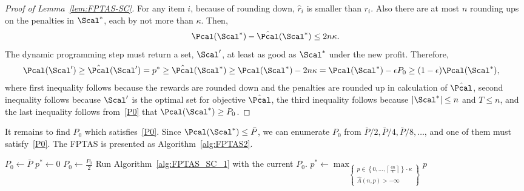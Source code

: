 \begin{proof}[Proof of Lemma~\ref{lem:FPTAS-SC}]
	For any item $i$, because of rounding down, $\hat{r}_i$ is smaller than $r_i$. Also there are at most $n$ rounding ups on the penalties in $\Scal^*$, each by not more than $\kappa$. Then,
	$$
	\Pcal(\Scal^*)-\hat{\Pcal}(\Scal^*)\leq  2n\kappa.
	$$
	The dynamic programming step must return a set, $\Scal'$, at least as good as $\Scal^*$ under the new profit. Therefore,
	\begin{align*}
	\Pcal(\Scal') &\geq \hat{\Pcal}(\Scal')=p^* \geq \hat{\Pcal}(\Scal^*)\geq \Pcal(\Scal^*)-2n\kappa=\Pcal(\Scal^*)-\epsilon P_0\geq (1-\epsilon)\Pcal(\Scal^*),
	\end{align*}
	where first inequality follows because the rewards are rounded down and the penalties are rounded up in calculation of $\hat{\Pcal}$, second inequality follows because $\Scal'$ is the optimal set for objective $\hat{\Pcal}$, the third inequality follows because $|\Scal^*|\leq n$ and $T\le n$, and the last inequality follows from~\eqref{P0} that $\Pcal(\Scal^*)\geq P_0$.
\end{proof}




It remains to find $P_0$ which satisfies~\eqref{P0}. Since $\Pcal(\Scal^*)\le \bar{P}$, we can enumerate $P_0$ from $\bar{P}/2, \bar{P}/4, \bar{P}/8,\ldots$, and one of them must satisfy~\eqref{P0}. The FPTAS is presented as Algorithm~\ref{alg:FPTAS2}.

\begin{algorithm}[H]
	\footnotesize
	\caption{FPTAS for MPBKP-S in $\mathcal{O}(n^2\log n/\epsilon)$}
	\label{alg:FPTAS2}
	\begin{algorithmic}[1]
		\State $P_0\gets {\bar{P}}$
		\State $p^*\gets 0$
		\vspace{0.1cm}
		\State $P_0\gets \frac{P_0}{2}$
		\vspace{0.1cm}
		\State	Run Algorithm~\ref{alg:FPTAS_SC_1} with the current $P_0$.
		\State $p^*\gets \max_{\left\{\substack{p\in \left\{ 0,\ldots,\left\lceil\frac{4n}{\epsilon}\right\rceil \right\} \cdot \kappa\\ \hat{A}(n,p)>-\infty}\right\}}p$
		\EndWhile
	\end{algorithmic}
\end{algorithm}

